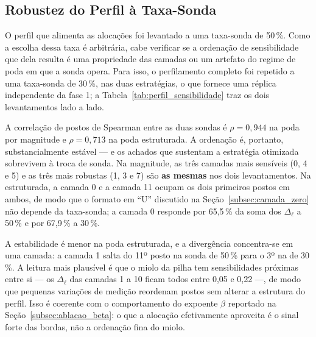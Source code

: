 \begin{table}[htb]
\centering
\caption{Taxas de poda por camada efetivamente aplicadas pela
Equação~\ref{eq:alocacao_dev} para taxa de poda de 50\,\% e $\beta = 1{,}0$
(coluna \texttt{taxas\_por\_camada} dos registros experimentais). $\beta$ é o expoente
de intensidade da equação, que controla o quanto a alocação segue o perfil de
sensibilidade; com $\beta = 1{,}0$, o perfil é seguido integralmente. A alocação
uniforme corresponderia a 50\,\% em todas as camadas.}
\label{tab:alocacao_50}
\small

\end{table}

\subsection{Robustez do Perfil à Taxa-Sonda}\label{subsec:robustez_sonda}

O perfil que alimenta as alocações foi levantado a uma taxa-sonda de 50\,\%. Como a
escolha dessa taxa é arbitrária, cabe verificar se a ordenação de
sensibilidade que dela resulta é uma propriedade das camadas ou um artefato do
regime de poda em que a sonda opera. Para isso, o perfilamento completo foi
repetido a uma taxa-sonda de 30\,\%, nas duas estratégias, o que fornece uma
réplica independente da fase 1; a Tabela~\ref{tab:perfil_sensibilidade} traz os dois
levantamentos lado a lado.

A correlação de postos de Spearman entre as duas sondas é $\rho = 0{,}944$ na
poda por magnitude e $\rho = 0{,}713$ na poda estruturada. A ordenação é,
portanto, substancialmente estável --- e os achados que sustentam a estratégia
otimizada sobrevivem à troca de sonda. Na magnitude, as três camadas mais
sensíveis (0, 4 e 5) e as três mais robustas (1, 3 e 7) são \textbf{as mesmas}
nos dois levantamentos. Na estruturada, a camada 0 e a camada 11 ocupam os dois
primeiros postos em ambos, de modo que o formato em ``U'' discutido na
Seção~\ref{subsec:camada_zero} não depende da taxa-sonda; a camada 0 responde
por 65,5\,\% da soma dos $\Delta_{\ell}$ a 50\,\% e por 67,9\,\% a 30\,\%.

A estabilidade é menor na poda estruturada, e a divergência concentra-se em uma
camada: a camada 1 salta do 11º posto na sonda de 50\,\% para o 3º na de
30\,\%. A leitura mais plausível é que o miolo da pilha tem sensibilidades
próximas entre si --- os $\Delta_{\ell}$ das camadas 1 a 10 ficam todos entre
0,05 e 0,22 ---, de modo que pequenas variações de medição reordenam postos sem
alterar a estrutura do perfil. Isso é coerente com o comportamento do expoente
$\beta$ reportado na Seção~\ref{subsec:ablacao_beta}: o que a alocação
efetivamente aproveita é o sinal forte das bordas, não a ordenação fina do
miolo.

